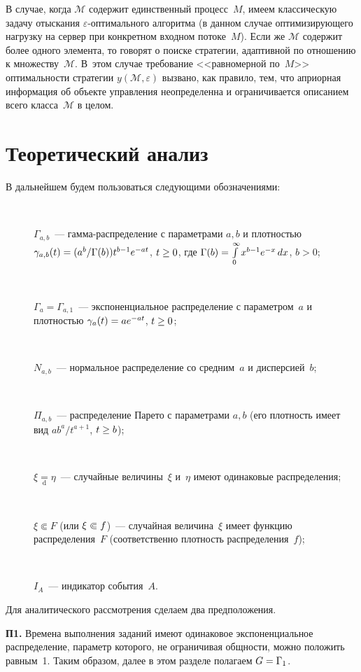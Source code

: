 \begin{multicols}{2}
  В случае, когда $\mathcal{M}$ содержит единственный процесс~$M$, имеем 
классическую задачу отыскания \mbox{$\varepsilon$-оп}\-ти\-маль\-но\-го алгоритма (в данном 
случае оптимизирующего нагрузку на сервер при конкретном входном потоке~$M$). Если 
же $\mathcal{M}$ содержит более одного элемента, то говорят о поиске стратегии, 
адап\-тив\-ной по отношению к множеству~$\mathcal{M}$. В~этом случае требование 
<<равномерной по~$M$>> оптимальности стратегии $y(\mathcal{M},\varepsilon)$ 
вызвано, как правило, тем, что априорная информация об объекте управления 
неопределенна и ограничивается описанием всего класса~$\mathcal{M}$ в целом.

\section{Теоретический анализ}

   В дальнейшем будем пользоваться следующими обозначениями:
\begin{description}
\item[\,]  $\Gamma_{a,b}$~---  гамма-распределение с параметрами $a,b$ и плот\-ностью 
$\gamma_{a,b}(t)\hm= (a^b/\Gamma(b)) t^{b-1} e^{-at}$, $t\hm\geq 0$, где $\Gamma(b)\hm= 
\int\limits_0^\infty x^{b-1} e^{-x}\,dx$, $b>0$;
   \item[\,]
   $\Gamma_a=\Gamma_{a,1}$~---   экспоненциальное распределение с параметром~$a$ и 
   плот\-ностью $\gamma_a(t)\hm= ae^{-at}$, $t\hm\geq 0$;
   \item[\,]   
   $N_{a,b}$~---  нормальное распределение со средним~$a$ и дисперсией~$b$;
      \item[\,]
   $\Pi_{a,b}$~--- распределение Парето с параметрами $a,b$ (его плотность имеет вид 
$ab^a/t^{a+1}$, $t\hm\geq b$);
      \item[\,]
   $\xi\underset{\mathrm{d}}{=}\eta$~---  случайные величины~$\xi$ и~$\eta$ имеют одинаковые 
распределения;
      \item[\,]
   $\xi\Subset F$ (или $\xi\hm\Subset f$)~---  случайная величина~$\xi$ имеет функцию 
распределения~$F$ (соответственно плотность распределения~$f$);
      \item[\,]
   $I_A$~--- индикатор события~$A$.
  \end{description}
  
  Для аналитического рассмотрения сделаем два предположения.
  \smallskip
  
  \noindent
  \textbf{П1.} Времена выполнения заданий имеют одинаковое экспоненциальное 
распределение, параметр которого, не ограничивая общности, можно положить равным~1. 
Таким образом, далее в этом разделе полагаем $G\hm=\Gamma_1$.
  

\end{multicols}
